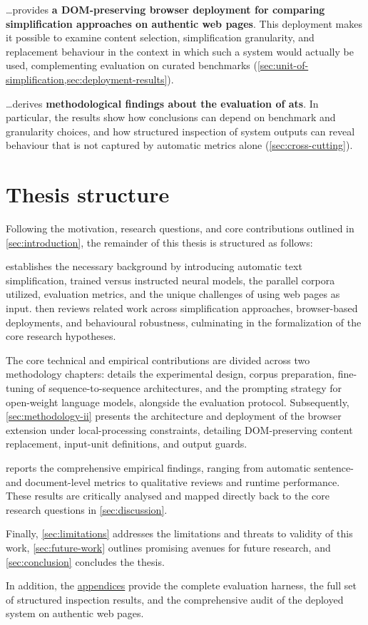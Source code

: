 \dots provides \textbf{a DOM-preserving browser deployment for comparing simplification approaches on authentic web pages}.
This deployment makes it possible to examine content selection, simplification granularity, and replacement behaviour in the context in which such a system would actually be used, complementing evaluation on curated benchmarks (\cref{sec:unit-of-simplification,sec:deployment-results}).

\dots derives \textbf{methodological findings about the evaluation of \gls{ats}}.
In particular, the results show how conclusions can depend on benchmark and granularity choices, and how structured inspection of system outputs can reveal behaviour that is not captured by automatic metrics alone (\cref{sec:cross-cutting}).

\section{Thesis structure}
\label{sec:structure}

Following the motivation, research questions, and core contributions outlined in \cref{sec:introduction}, the remainder of this thesis is structured as follows:

 establishes the necessary background by introducing automatic text simplification, trained versus instructed neural models, the parallel corpora utilized, evaluation metrics, and the unique challenges of using web pages as input.
 then reviews related work across simplification approaches, browser-based deployments, and behavioural robustness, culminating in the formalization of the core research hypotheses.

The core technical and empirical contributions are divided across two methodology chapters:
 details the experimental design, corpus preparation, fine-tuning of sequence-to-sequence architectures, and the prompting strategy for open-weight language models, alongside the evaluation protocol.
Subsequently, \cref{sec:methodology-ii} presents the architecture and deployment of the browser extension under local-processing constraints, detailing DOM-preserving content replacement, input-unit definitions, and output guards.

 reports the comprehensive empirical findings, ranging from automatic sentence- and document-level metrics to qualitative reviews and runtime performance.
These results are critically analysed and mapped directly back to the core research questions in \cref{sec:discussion}.

Finally, \cref{sec:limitations} addresses the limitations and threats to validity of this work, \cref{sec:future-work} outlines promising avenues for future research, and \cref{sec:conclusion} concludes the thesis.

In addition, the \hyperref[app:appendix]{appendices} provide the complete evaluation harness, the full set of structured inspection results, and the comprehensive audit of the deployed system on authentic web pages.
